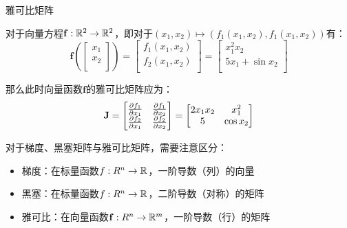 \documentclass[11pt]{article}
\begin{document}
\begin{appendices}
\begin{example}
    雅可比矩阵

    对于向量方程$\mathbf{f}:\mathbb{R}^2 \rightarrow \mathbb{R}^2$，即对于$(x_1,x_2) \mapsto (f_1(x_1,x_2),f_1(x_1,x_2))$有：
    \begin{equation*}
        \mathbf{f}\left(
            \begin{bmatrix}
                x_1 \\
                x_2 \\
            \end{bmatrix}
        \right)
        = \begin{bmatrix}
            f_1(x_1,x_2) \\
            f_2(x_1,x_2) \\
        \end{bmatrix}
        = \begin{bmatrix}
            x_1^2 x_2 \\
            5x_1 + \sin x_2 \\
        \end{bmatrix}
    \end{equation*}

    那么此时向量函数$\mathbf{f}$的雅可比矩阵应为：
    \begin{equation*}
       \mathbf{J} = \begin{bmatrix}
            \frac{\partial f_1}{\partial x_1} & \frac{\partial f_1}{\partial x_2} \\
            \frac{\partial f_2}{\partial x_1} & \frac{\partial f_2}{\partial x_2} \\
        \end{bmatrix}
        = \begin{bmatrix}
            2 x_1 x_2 & x_1^2 \\
            5 & \cos x_2 \\
        \end{bmatrix}
    \end{equation*}
    
\end{example}

对于梯度、黑塞矩阵与雅可比矩阵，需要注意区分：
\begin{itemize}
    \item 梯度：在标量函数$f:R^n \rightarrow \mathbb{R}$，一阶导数（列）的向量
    \item 黑塞：在标量函数$f:R^n \rightarrow \mathbb{R}$，二阶导数（对称）的矩阵
    \item 雅可比：在向量函数$\mathbf{f}:R^n \rightarrow \mathbb{R}^m$，一阶导数（行）的矩阵
\end{itemize}


\end{appendices}
\end{document}

